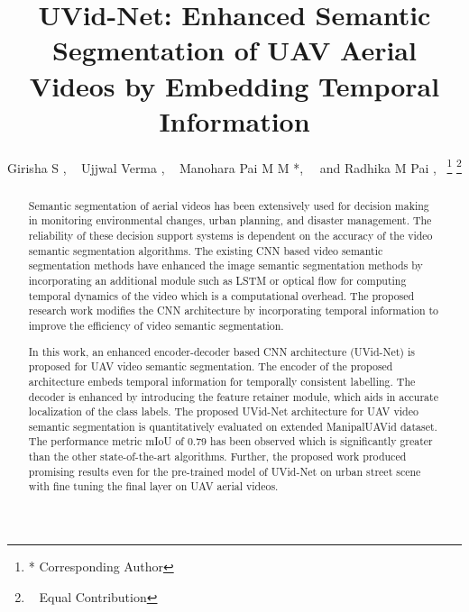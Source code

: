 \documentclass[journal]{IEEEtran}
\begin{document}
\title{UVid-Net: Enhanced Semantic Segmentation of UAV Aerial Videos by Embedding Temporal Information}


\author{Girisha S , ~
         Ujjwal Verma , ~
        Manohara Pai M M *,~
        ~and Radhika M Pai ,~ \thanks{* Corresponding Author}
\thanks{\dag ~ Equal Contribution}}




















\maketitle

\begin{abstract}
Semantic segmentation of aerial videos has been extensively used for decision making in monitoring environmental changes, urban planning, and disaster management. The reliability of these decision support systems is dependent on the accuracy of the video semantic segmentation algorithms. The existing CNN based  video semantic segmentation methods have enhanced the image semantic segmentation methods by incorporating an additional module such as LSTM or optical flow for computing temporal dynamics of the video  which is a computational overhead. The proposed research work modifies the CNN architecture by incorporating temporal information to improve the efficiency of video semantic segmentation. 


In this work, an enhanced encoder-decoder based CNN architecture (UVid-Net) is proposed for UAV video semantic segmentation. The encoder of the proposed architecture embeds temporal information for temporally consistent labelling. The decoder is enhanced by introducing the feature retainer module, which aids in accurate localization of the class labels. The proposed UVid-Net architecture for UAV video semantic segmentation is quantitatively evaluated on extended ManipalUAVid  dataset. The performance metric mIoU of 0.79 has been observed which is significantly greater than the other state-of-the-art algorithms. Further, the proposed work produced promising results even for the pre-trained model of UVid-Net on urban street scene with fine tuning the final layer on UAV aerial videos.


\end{abstract}
\end{document}
